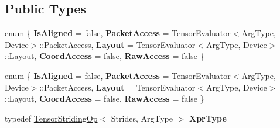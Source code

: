 \subsection*{Public Types}
\begin{DoxyCompactItemize}
\item 
\mbox{\label{struct_eigen_1_1_tensor_evaluator_3_01const_01_tensor_striding_op_3_01_strides_00_01_arg_type_01_4_00_01_device_01_4_a4b94a4bac72d2e293ef8594dabe70ad1}} 
enum \{ \newline
{\bfseries Is\+Aligned} = false, 
{\bfseries Packet\+Access} = Tensor\+Evaluator$<$Arg\+Type, Device$>$\+:\+:Packet\+Access, 
{\bfseries Layout} = Tensor\+Evaluator$<$Arg\+Type, Device$>$\+:\+:Layout, 
{\bfseries Coord\+Access} = false, 
\newline
{\bfseries Raw\+Access} = false
 \}
\item 
\mbox{\label{struct_eigen_1_1_tensor_evaluator_3_01const_01_tensor_striding_op_3_01_strides_00_01_arg_type_01_4_00_01_device_01_4_ad7c33ddf4849352b7eaf6274641681b0}} 
enum \{ \newline
{\bfseries Is\+Aligned} = false, 
{\bfseries Packet\+Access} = Tensor\+Evaluator$<$Arg\+Type, Device$>$\+:\+:Packet\+Access, 
{\bfseries Layout} = Tensor\+Evaluator$<$Arg\+Type, Device$>$\+:\+:Layout, 
{\bfseries Coord\+Access} = false, 
\newline
{\bfseries Raw\+Access} = false
 \}
\item 
\mbox{\label{struct_eigen_1_1_tensor_evaluator_3_01const_01_tensor_striding_op_3_01_strides_00_01_arg_type_01_4_00_01_device_01_4_a220de0e6c74ad9524d0622f0844d4190}} 
typedef \hyperlink{class_eigen_1_1_tensor_striding_op}{Tensor\+Striding\+Op}$<$ Strides, Arg\+Type $>$ {\bfseries Xpr\+Type}
\item 
\mbox{\label{struct_eigen_1_1_tensor_evaluator_3_01const_01_tensor_striding_op_3_01_strides_00_01_arg_type_01_4_00_01_device_01_4_a95618362d09c92081aa4916c1009929c}} 

\end{DoxyCompactItemize}
